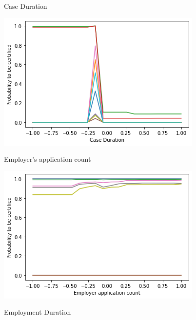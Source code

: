 \documentclass{article}
\begin{document}
\begin{figure}[H]
    \begin{minipage}{.30\textwidth}
        \centering
        \caption{Case Duration}
        \includegraphics[width = \textwidth]{figures/case_duration.png}
        \label{fig:case_duration}
    \end{minipage}
    \begin{minipage}{.31\textwidth}
        \centering
        \caption{Employer's application count}
        \includegraphics[width = \textwidth]{figures/application_count.png}
        \label{fig:count}
    \end{minipage}
    \begin{minipage}{.31\textwidth}
        \centering
        \caption{Employment Duration}

\end{minipage}
\end{figure}
\end{document}
